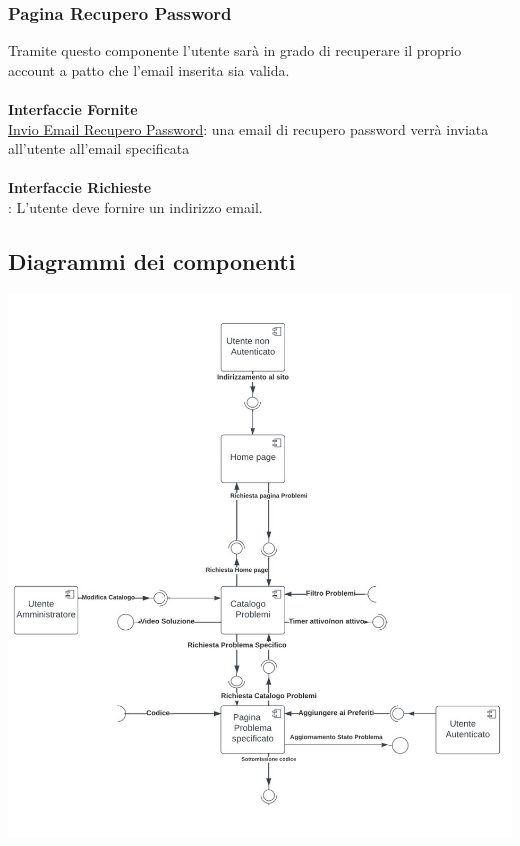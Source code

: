 \documentclass[11pt, a4paper]{article}
\theoremstyle{definition} %
\begin{document}
\subsubsection{Pagina Recupero Password}
Tramite questo componente l'utente sarà in grado di recuperare il proprio account a patto che l'email inserita sia valida.
\\\\\textbf{Interfaccie Fornite}\\
\underline{Invio Email Recupero Password}: una email di recupero password verrà inviata all'utente all'email specificata
\\\\\textbf{Interfaccie Richieste}\\
: L'utente deve fornire un indirizzo email.
\subsection{Diagrammi dei componenti}
\begin{center}
    \includegraphics[width=1.2\textwidth]{materiale/site-ux.jpg}
\end{center}
  
\end{document}

